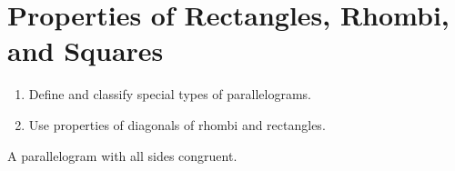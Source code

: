 \documentclass{article}
\begin{document}
\section*{Properties of Rectangles, Rhombi, and Squares}

\begin{tcolorbox}[colframe=orange!70!white, coltitle=black, title=\textbf{Today I Can}]
\begin{enumerate}
    \item Define and classify special types of parallelograms.
    \item Use properties of diagonals of rhombi and rectangles.
\end{enumerate}
\end{tcolorbox}
\bigskip 

\begin{tcolorbox}[colframe=black!20!white, opacitybacktitle=0.1, coltitle=black, title=\textbf{Rhombus}]
A parallelogram with all sides congruent. \newline 

\end{tcolorbox}
\end{document}
